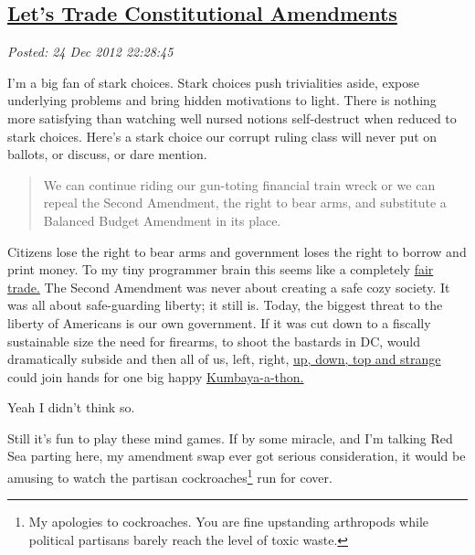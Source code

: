 %

\subsection*{\href{https://bakerjd99.wordpress.com/2012/12/24/lets-trade-constitutional-amendments/}{Let's Trade Constitutional Amendments}}


\noindent\emph{Posted: 24 Dec 2012 22:28:45}
\vspace{6pt}

I'm a big fan of stark choices. Stark choices push trivialities aside,
expose underlying problems and bring hidden motivations to light. There
is nothing more satisfying than watching well nursed notions
self-destruct when reduced to stark choices. Here's a stark choice our
corrupt ruling class will never put on ballots, or discuss, or dare
mention.

\begin{quote}
We can continue riding our gun-toting financial train wreck or we can
repeal the Second Amendment, the right to bear arms, and substitute a
Balanced Budget Amendment in its place.
\end{quote}

Citizens lose the right to bear arms and government loses the right to
borrow and print money. To my tiny programmer brain this seems like a
completely \href{http://www.globalexchange.org/programs/fairtrade}{fair
trade.} The Second Amendment was never about creating a safe cozy
society. It was all about safe-guarding liberty; it still is. Today, the
biggest threat to the liberty of Americans is our own government. If it
was cut down to a fiscally sustainable size the need for firearms, to
shoot the bastards in DC, would dramatically subside and then all of us,
left,
right, \href{http://public.web.cern.ch/public/en/science/standardmodel-en.html}{up,
down, top and strange} could join hands for one big happy
\href{http://www.urbandictionary.com/define.php?term=kumbaya}{Kumbaya-a-thon.}

Yeah I didn't think so.

Still it's fun to play these mind games. If by some miracle, and I'm
talking Red Sea parting here, my amendment swap ever got serious
consideration, it would be amusing to watch the partisan
cockroaches\footnote{
  My apologies to cockroaches. You are fine upstanding arthropods while
  political partisans barely reach the level of toxic
  waste.
} run for cover.

